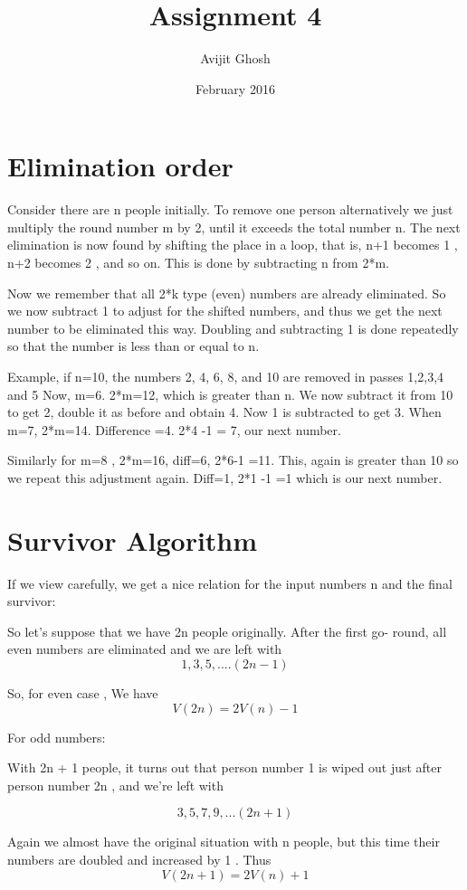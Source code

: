 \documentclass{article}
\title{Assignment 4}
\author{Avijit Ghosh }
\date{February 2016}
\begin{document}
\maketitle

\section{Elimination order}

Consider there are n people initially. To remove one person alternatively we just multiply the
round number m by 2, until it exceeds the total number n. The next elimination is now found by 
shifting the place in a loop, that is, n+1 becomes 1 , n+2 becomes 2 , and so on. This is done by 
subtracting n from 2*m. 

Now we remember that all 2*k type (even) numbers are already eliminated.
So we now subtract 1 to adjust for the shifted numbers, and thus we get the next number to be eliminated this way. Doubling and subtracting 1 is done repeatedly so that the number is less than or equal to n.

Example, if n=10, the numbers 2, 4, 6, 8, and 10 are removed in passes 1,2,3,4 and 5
Now, m=6. 2*m=12, which is greater than n. We now subtract it from 10 to get 2, double it as before 
and obtain 4. Now 1 is subtracted to get 3. 
When m=7, 2*m=14. Difference =4. 2*4 -1 = 7, our next number. 

Similarly for m=8 , 2*m=16, diff=6, 2*6-1 =11. This, again is greater than 10 so we repeat this 
adjustment again. Diff=1, 2*1 -1 =1 which is our next number.

\section{Survivor Algorithm}

If we view carefully, we get a nice relation for the input numbers n and the final survivor:

So let's suppose that we have 2n people originally. After the first go-
round, all even numbers are eliminated and we are left with $$1, 3, 5, .... (2n-1)$$

So, for even case , 
We have $$V(2n) = 2V(n)-1 $$

For odd numbers:

With 2n + 1 people, it turns out that
person number 1 is wiped out just after person number 2n , and we're left with

$$3, 5, 7, 9,...(2n+1)$$

Again we almost have the original situation with n people, but this time their
numbers are doubled and increased by 1 . Thus
$$V(2n + 1) = 2V(n) + 1$$
\end{document}
